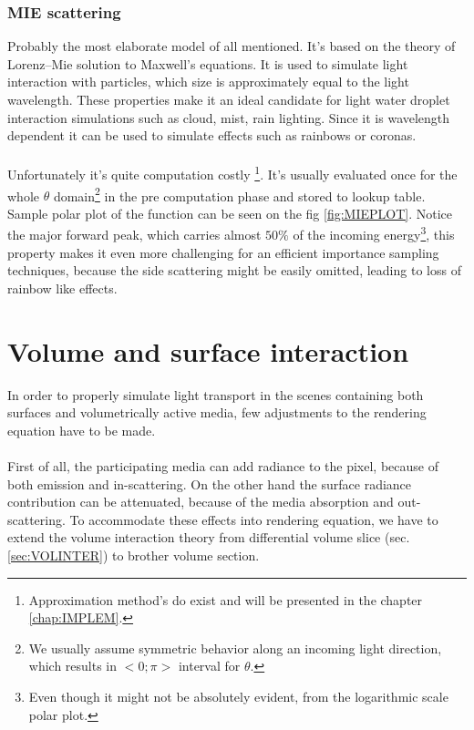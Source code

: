 \subsubsection{MIE scattering}
\label{lab:MIE}
Probably the most elaborate model of all mentioned. It's based on the theory of Lorenz–Mie solution to Maxwell's equations. It is used to simulate light interaction with particles, which size is approximately equal to the light wavelength. These properties make it an ideal candidate for light water droplet interaction simulations such as cloud, mist, rain lighting. Since it is wavelength dependent it can be used to simulate effects such as rainbows or coronas.
\\
\\
Unfortunately it's quite computation costly \footnote{Approximation method's do exist and will be presented in the chapter \ref{chap:IMPLEM}.}. It's usually evaluated once for the whole $\theta$ domain\footnote{We usually assume symmetric behavior along an incoming light direction, which results in $<0;\pi>$ interval for $\theta$.} in the pre computation phase and stored to lookup table. Sample polar plot of the function can be seen on the fig \ref{fig:MIEPLOT}. Notice the major forward peak, which carries almost $50\%$ of the incoming energy\footnote{Even though it might not be absolutely evident, from the logarithmic scale polar plot.}, this property makes it even more challenging for an efficient importance sampling techniques, because the side scattering might be easily omitted, leading to loss of rainbow like effects.



\section{Volume and surface interaction}
\label{sec:EXTREND}
In order to properly simulate light transport in the scenes containing both surfaces and volumetrically active media, few adjustments to the rendering equation have to be made.
\\
\\
First of all, the participating media can add radiance to the pixel, because of both emission and in-scattering. On the other hand the surface radiance contribution can be attenuated, because of the media absorption and out-scattering. To accommodate these effects into rendering equation, we have to extend the volume interaction theory  from differential volume slice (sec. \ref{sec:VOLINTER}) to brother volume section.

